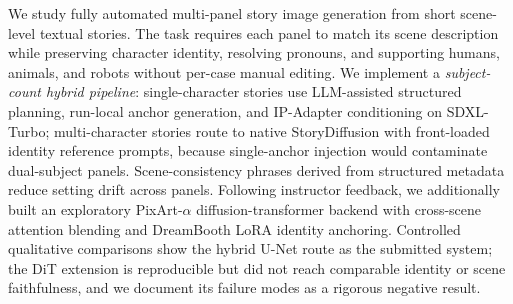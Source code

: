 We study fully automated multi-panel story image generation from short scene-level textual stories.
The task requires each panel to match its scene description while preserving character identity, resolving pronouns, and supporting humans, animals, and robots without per-case manual editing.
We implement a \emph{subject-count hybrid pipeline}: single-character stories use LLM-assisted structured planning, run-local anchor generation, and IP-Adapter conditioning on SDXL-Turbo; multi-character stories route to native StoryDiffusion with front-loaded identity reference prompts, because single-anchor injection would contaminate dual-subject panels.
Scene-consistency phrases derived from structured metadata reduce setting drift across panels.
Following instructor feedback, we additionally built an exploratory PixArt-$\alpha$ diffusion-transformer backend with cross-scene attention blending and DreamBooth LoRA identity anchoring.
Controlled qualitative comparisons show the hybrid U-Net route as the submitted system; the DiT extension is reproducible but did not reach comparable identity or scene faithfulness, and we document its failure modes as a rigorous negative result.

